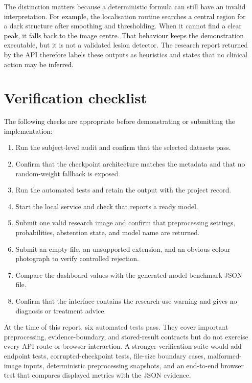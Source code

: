 The distinction matters because a deterministic formula can still have an invalid interpretation. For example, the localisation routine searches a central region for a dark structure after smoothing and thresholding. When it cannot find a clear peak, it falls back to the image centre. That behaviour keeps the demonstration executable, but it is not a validated lesion detector. The research report returned by the API therefore labels these outputs as heuristics and states that no clinical action may be inferred.

\section{Verification checklist}

The following checks are appropriate before demonstrating or submitting the implementation:

\begin{enumerate}
    \item Run the subject-level audit and confirm that the selected datasets pass.
    \item Confirm that the checkpoint architecture matches the metadata and that no random-weight fallback is exposed.
    \item Run the automated tests and retain the output with the project record.
    \item Start the local service and check that  reports a ready model.
    \item Submit one valid research image and confirm that preprocessing settings, probabilities, abstention state, and model name are returned.
    \item Submit an empty file, an unsupported extension, and an obvious colour photograph to verify controlled rejection.
    \item Compare the dashboard values with the generated model benchmark JSON file.
    \item Confirm that the interface contains the research-use warning and gives no diagnosis or treatment advice.
\end{enumerate}

At the time of this report, six automated tests pass. They cover important preprocessing, evidence-boundary, and stored-result contracts but do not exercise every API route or browser interaction. A stronger verification suite would add endpoint tests, corrupted-checkpoint tests, file-size boundary cases, malformed-image inputs, deterministic preprocessing snapshots, and an end-to-end browser test that compares displayed metrics with the JSON evidence.

